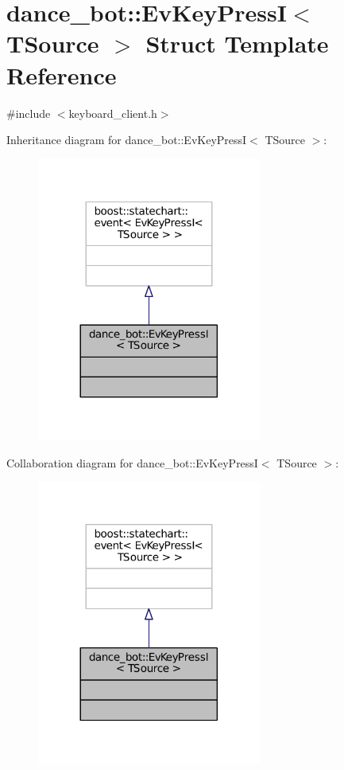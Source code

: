 \hypertarget{structdance__bot_1_1EvKeyPressI}{}\section{dance\+\_\+bot\+:\+:Ev\+Key\+PressI$<$ T\+Source $>$ Struct Template Reference}
\label{structdance__bot_1_1EvKeyPressI}


{\ttfamily \#include $<$keyboard\+\_\+client.\+h$>$}



Inheritance diagram for dance\+\_\+bot\+:\+:Ev\+Key\+PressI$<$ T\+Source $>$\+:
\nopagebreak
\begin{figure}[H]
\begin{center}
\leavevmode
\includegraphics[width=209pt]{structdance__bot_1_1EvKeyPressI__inherit__graph}
\end{center}
\end{figure}


Collaboration diagram for dance\+\_\+bot\+:\+:Ev\+Key\+PressI$<$ T\+Source $>$\+:
\nopagebreak
\begin{figure}[H]
\begin{center}
\leavevmode
\includegraphics[width=209pt]{structdance__bot_1_1EvKeyPressI__coll__graph}
\end{center}
\end{figure}


